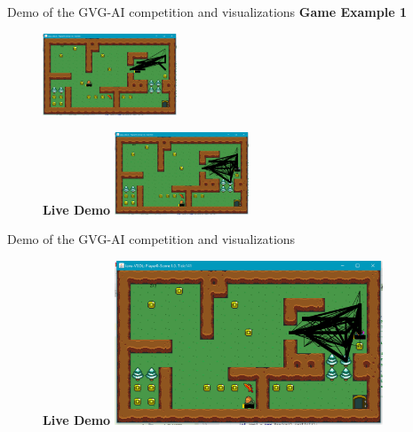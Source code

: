 \documentclass{beamer}
\begin{document}
\begin{frame}{Demo of the GVG-AI competition and visualizations}
		\textbf{Game Example 1}
		\begin{figure}[t]
				\includegraphics[width=4cm]{Game-51-1}
				\centering
		\end{figure} 
		
		\begin{figure}[t]
				\textbf{Live Demo}
				\includegraphics[width=4cm]{Game-51-2}
				\centering
		\end{figure} \pause
		
\end{frame}

\begin{frame}{Demo of the GVG-AI competition and visualizations}
		\begin{figure}[t]
				\textbf{Live Demo}
				\includegraphics[width=8cm]{Game-51-2}
				\centering
		\end{figure} \pause
		
\end{frame}
\end{document}
